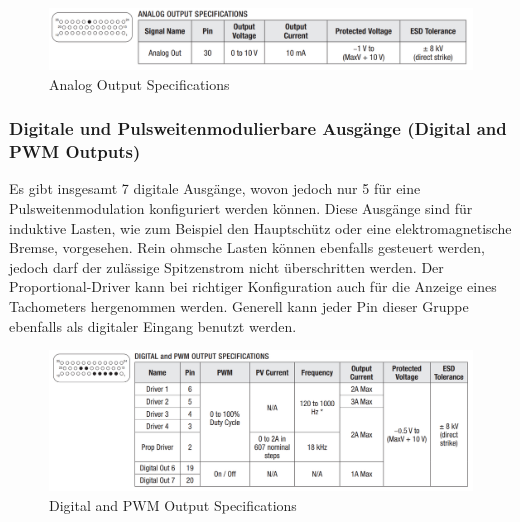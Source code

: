 \begin{figure}[H]
	\begin{center}
		\includegraphics[width=\textwidth]{figures/antrieb/Analog_Output_Specifications.png}
		\caption{Analog Output Specifications}
	\end{center}
\end{figure}


\newpage



\subsubsection{Digitale und Pulsweitenmodulierbare Ausgänge (Digital and PWM Outputs)}
Es gibt insgesamt 7 digitale Ausgänge, wovon jedoch nur 5 für eine Pulsweitenmodulation konfiguriert werden können. Diese Ausgänge sind für induktive Lasten, wie zum Beispiel den Hauptschütz oder eine elektromagnetische Bremse, vorgesehen. Rein ohmsche Lasten können ebenfalls gesteuert werden, jedoch darf der zulässige Spitzenstrom nicht überschritten werden. Der Proportional-Driver kann bei richtiger Konfiguration auch für die Anzeige eines Tachometers hergenommen werden. Generell kann jeder Pin dieser Gruppe ebenfalls als digitaler Eingang benutzt werden.

\begin{figure}[H]
	\begin{center}
		\includegraphics[width=\textwidth]{figures/antrieb/Digital_PWM_Output_Specifications.png}
		\caption{Digital and PWM Output Specifications}
	\end{center}
\end{figure}



